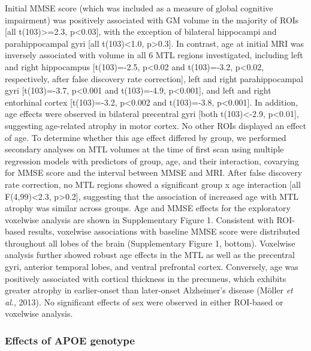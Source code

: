 \documentclass[]{article}
\begin{document}
Initial MMSE score (which was included as a measure of global cognitive
impairment) was positively associated with GM volume in the majority of
ROIs {[}all t(103)\textgreater{}=2.3, p\textless{}0.03{]}, with the
exception of bilateral hippocampi and parahippocampal gyri {[}all
t(103)\textless{}1.0, p\textgreater{}0.3{]}. In contrast, age at initial
MRI was inversely associated with volume in all 6 MTL regions
investigated, including left and right hippocampus {[}t(103)=-2.5,
p\textless{}0.02 and t(103)=-3.2, p\textless{}0.02, respectively, after
false discovery rate correction{]}, left and right parahippocampal gyri
{[}t(103)=-3.7, p\textless{}0.001 and t(103)=-4.9, p\textless{}0.001{]},
and left and right entorhinal cortex {[}t(103)=-3.2, p\textless{}0.002
and t(103)=-3.8, p\textless{}0.001{]}. In addition, age effects were
observed in bilateral precentral gyri {[}both t(103)\textless{}-2.9,
p\textless{}0.01{]}, suggesting age-related atrophy in motor cortex. No
other ROIs displayed an effect of age. To determine whether this age
effect differed by group, we performed secondary analyses on MTL volumes
at the time of first scan using multiple regression models with
predictors of group, age, and their interaction, covarying for MMSE
score and the interval between MMSE and MRI. After false discovery rate
correction, no MTL regions showed a significant group x age interaction
{[}all F(4,99)\textless{}2.3, p\textgreater{}0.2{]}, suggesting that the
association of increased age with MTL atrophy was similar across groups.
Age and MMSE effects for the exploratory voxelwise analysis are shown in
Supplementary Figure 1. Consistent with ROI-based results, voxelwise
associations with baseline MMSE score were distributed throughout all
lobes of the brain (Supplementary Figure 1, bottom). Voxelwise analysis
further showed robust age effects in the MTL as well as the precentral
gyri, anterior temporal lobes, and ventral prefrontal cortex.
Conversely, age was positively associated with cortical thickness in the
precuneus, which exhibits greater atrophy in earlier-onset than
later-onset Alzheimer's disease (Möller \emph{et al.}, 2013). No
significant effects of sex were observed in either ROI-based or
voxelwise analysis.

\subsubsection*{Effects of APOE
genotype}\label{effects-of-apoe-genotype}
\end{document}
